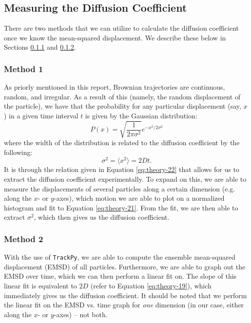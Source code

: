 \documentclass[twocolumn,amsmath,amssymb,pra, floatfix]{revtex4-2}
\begin{document}
\subsection{Measuring the Diffusion Coefficient}
There are two methods that we can utilize to calculate the diffusion coefficient once we know the mean-squared displacement. We describe these below in Sections \ref{sec:diffusion method 1} and \ref{sec:diffusion method 2}.

\subsubsection{Method 1}
\label{sec:diffusion method 1}
As priorly mentioned in this report, Brownian trajectories are continuous, random, and irregular. As a result of this (namely, the random displacement of the particle), we have that the probability for any particular displacement (say, $x$) in a given time interval $t$ is given by the Gaussian distribution:
\begin{equation}
    P( x )
    =
    \sqrt{\frac{1}{2 \pi \sigma^{2}}}
    e^{- x^{2}/2 \sigma^{2}}
    \label{eq:theory-21}
\end{equation}
where the width of the distribution is related to the diffusion coefficient by the following:
\begin{equation}
    \sigma^{2}
    =
    \langle x^{2} \rangle 
    =
    2 D t.
    \label{eq:theory-22}
\end{equation}
It is through the relation given in Equation \ref{eq:theory-22} that allows for us to extract the diffusion coefficient experimentally. To expand on this, we are able to measure the displacements of several particles along a certain dimension (e.g. along the $x$- or $y$-axes), which motion we are able to plot on a normalized histogram and fit to Equation \ref{eq:theory-21}. From the fit, we are then able to extract $\sigma^{2}$, which then gives us the diffusion coefficient.

\subsubsection{Method 2}
\label{sec:diffusion method 2}
With the use of \texttt{TrackPy}, we are able to compute the ensemble mean-squared displacement (EMSD) of all particles. Furthermore, we are able to graph out the EMSD over time, which we can then perform a linear fit on. The slope of this linear fit is equivalent to $2D$ (refer to Equation \ref{eq:theory-19}), which immediately gives us the diffusion coefficient. It should be noted that we perform the linear fit on the EMSD vs. time graph for \emph{one} dimension (in our case, either along the $x$- or $y$-axes) -- not both.
\end{document}
